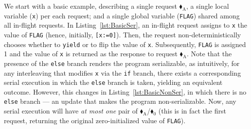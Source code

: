 
We start with a basic example, describing a single request {\color{ForestGreen}$\blacklozenge_\text{A}$}, a single local variable (\texttt{x}) per each request; and a single global variable (\texttt{FLAG}) shared among all in-flight requests. 
%
In Listing~\ref{lst:BasicSer}, an in-flight request assigns to \texttt{x} the value of \texttt{FLAG} (hence, initially, \texttt{[x:=0]}). Then, the request non-deterministically chooses whether to \texttt{yield} or to flip the value of \texttt{x}. Subsequently, \texttt{FLAG} is assigned 1 and the value of \texttt{x} is returned as the response to request {\color{ForestGreen}$\blacklozenge_\text{A}$}. 
%
Note that the presence of the \texttt{else} branch renders the program serializable, as intuitively, 
for any interleaving that modifies \texttt{x} via the \texttt{if} branch, there exists a corresponding serial execution in which the \texttt{else} branch is taken, yielding an equivalent outcome.
%
However, this changes in  Listing~\ref{lst:BasicNonSer},
%
%
%
%
%
%
%
%
%
in which there is no \texttt{else} branch --- an update that makes the program non-serializable.
%
Now, any serial execution will have \textit{at most one} pair of {\color{ForestGreen}$\blacklozenge_\text{A}$}/{\color{red}$\blacklozenge_0$} (this is in fact the first request, returning the original zero-initialized value of \texttt{FLAG}).

